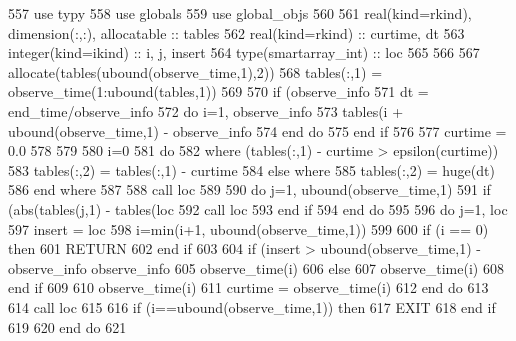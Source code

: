 \begin{DoxyCode}
557       \textcolor{keywordtype}{use }typy
558       \textcolor{keywordtype}{use }globals
559       \textcolor{keywordtype}{use }global_objs
560       
561       \textcolor{keywordtype}{real(kind=rkind)}, \textcolor{keywordtype}{dimension(:,:)}, \textcolor{keywordtype}{allocatable} :: tables
562       \textcolor{keywordtype}{real(kind=rkind)} :: curtime, dt
563       \textcolor{keywordtype}{integer(kind=ikind)} :: i, j, insert
564       \textcolor{keywordtype}{type}(smartarray_int) :: loc
565       
566       
567       \textcolor{keyword}{allocate}(tables(ubound(observe_time,1),2))      
568       tables(:,1) = observe_time(1:ubound(tables,1))%
569       
570       \textcolor{keywordflow}{if} (observe_info%
571         dt = end_time/observe_info%
572         \textcolor{keywordflow}{do} i=1, observe_info%
573           tables(i + ubound(observe_time,1) - observe_info%
574 \textcolor{keywordflow}{        end do}  
575 \textcolor{keywordflow}{      end if}
576  
577       curtime = 0.0
578 
579       
580       i=0
581       \textcolor{keywordflow}{do}
582         \textcolor{keywordflow}{where} (tables(:,1) - curtime > epsilon(curtime))
583           tables(:,2) = tables(:,1) - curtime
584         \textcolor{keywordflow}{else} \textcolor{keywordflow}{where}
585           tables(:,2) = huge(dt)
586 \textcolor{keywordflow}{        end where}
587         
588         \textcolor{keyword}{call }loc%
589         
590         \textcolor{keywordflow}{do} j=1, ubound(observe_time,1)
591           \textcolor{keywordflow}{if} (abs(tables(j,1) - tables(loc%
592             \textcolor{keyword}{call }loc%
593 \textcolor{keywordflow}{          end if}
594 \textcolor{keywordflow}{        end do}
595         
596         \textcolor{keywordflow}{do} j=1, loc%
597           insert = loc%
598           i=min(i+1, ubound(observe_time,1))
599           
600           \textcolor{keywordflow}{if} (i == 0) \textcolor{keywordflow}{then}
601             \textcolor{keywordflow}{RETURN}
602 \textcolor{keywordflow}{          end if}
603           
604           \textcolor{keywordflow}{if} (insert >  ubound(observe_time,1) - observe_info%
      observe_info%
605             observe_time(i)%
606           \textcolor{keywordflow}{else}
607             observe_time(i)%
608 \textcolor{keywordflow}{          end if}
609           
610           observe_time(i)%
611           curtime = observe_time(i)%
612 \textcolor{keywordflow}{        end do}
613 
614         \textcolor{keyword}{call }loc%
615         
616         \textcolor{keywordflow}{if} (i==ubound(observe_time,1)) \textcolor{keywordflow}{then}
617           \textcolor{keywordflow}{EXIT}
618 \textcolor{keywordflow}{        end if}
619         
620 \textcolor{keywordflow}{      end do}
621       
\end{DoxyCode}


